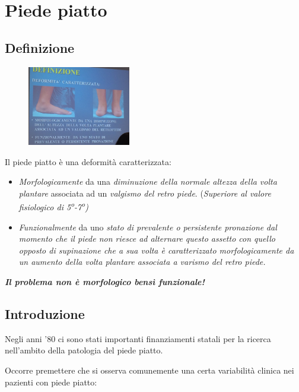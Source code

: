 \section{Piede piatto}

\subsection{Definizione}

\begin{figure}[!ht]
\centering
\includegraphics[width=0.4\textwidth]{014/image1.jpeg}
\end{figure}

Il piede piatto è una deformità caratterizzata:

\begin{itemize}
\item
  \emph{Morfologicamente} da una \emph{diminuzione della normale altezza della volta plantare} associata ad un \emph{valgismo del retro piede}. (\emph{Superiore al valore fisiologico di 5\textsuperscript{o}-7\textsuperscript{o})}
\item
  \emph{Funzionalmente} da uno \emph{stato di prevalente o persistente pronazione} \emph{dal momento che il piede non riesce ad alternare questo assetto con quello opposto di supinazione che a sua volta è caratterizzato morfologicamente da un aumento della volta plantare associata a varismo del retro piede.}
\end{itemize}

\textbf{\emph{Il problema non è morfologico bensì funzionale!}}

\subsection{Introduzione}

Negli anni '80 ci sono stati importanti finanziamenti statali per la ricerca nell'ambito della patologia del piede piatto.

Occorre premettere che si osserva comunemente una certa variabilità clinica nei pazienti con piede piatto:

